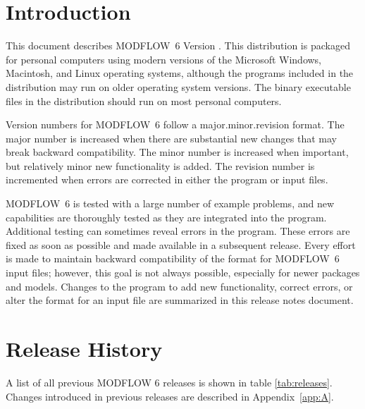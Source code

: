 \documentclass[11pt,twoside,twocolumn]{usgsreport}
\begin{document}
\ifdef{\makefrontcoveralt}{\makefrontcoveralt}{\makefrontcover}

\ifdef{\makefrontmatterabv}{\makefrontmatterabv}{\makefrontmatter}

\onecolumn
\pagestyle{body}
\RaggedRight
{}
\pagestyle{body}
\setlength{\parindent}{1.5pc}

\section{Introduction}
This document describes MODFLOW~6 Version \modflowversion.  This distribution is packaged for personal computers using modern versions of the Microsoft Windows, Macintosh, and Linux operating systems, although the programs included in the distribution may run on older operating system versions.  The binary executable files in the distribution should run on most personal computers.

Version numbers for MODFLOW~6 follow a major.minor.revision format.  The major number is increased when there are substantial new changes that may break backward compatibility.  The minor number is increased when important, but relatively minor new functionality is added.  The revision number is incremented when errors are corrected in either the program or input files.

MODFLOW~6 is tested with a large number of example problems, and new capabilities are thoroughly tested as they are integrated into the program.  Additional testing can sometimes reveal errors in the program.  These errors are fixed as soon as possible and made available in a subsequent release.  Every effort is made to maintain backward compatibility of the format for MODFLOW~6 input files; however, this goal is not always possible, especially for newer packages and models.  Changes to the program to add new functionality, correct errors, or alter the format for an input file are summarized in this release notes document.


\section{Release History}
A list of all previous MODFLOW 6 releases is shown in table \ref{tab:releases}.  Changes introduced in previous releases are described in Appendix~\ref{app:A}.
\end{document}
